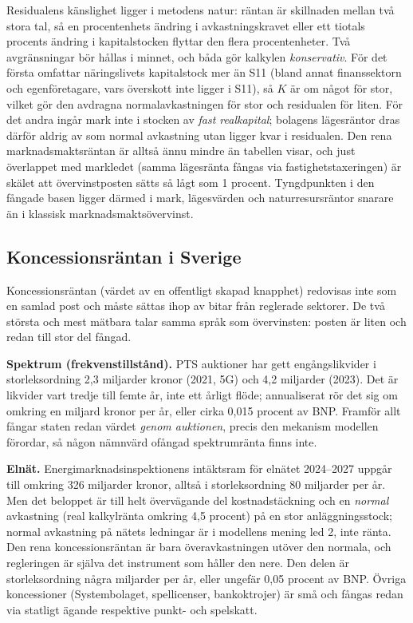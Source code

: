 \documentclass[11pt]{article}
\begin{document}
Residualens känslighet ligger i metodens natur: räntan är skillnaden mellan två stora tal, så en procentenhets ändring i avkastningskravet eller ett tiotals procents ändring i kapitalstocken flyttar den flera procentenheter. Två avgränsningar bör hållas i minnet, och båda gör kalkylen \emph{konservativ}. För det första omfattar näringslivets kapitalstock mer än S11 (bland annat finanssektorn och egenföretagare, vars överskott inte ligger i S11), så $K$ är om något för stor, vilket gör den avdragna normalavkastningen för stor och residualen för liten. För det andra ingår mark inte i stocken av \emph{fast realkapital}; bolagens lägesräntor dras därför aldrig av som normal avkastning utan ligger kvar i residualen. Den rena marknadsmaktsräntan är alltså ännu mindre än tabellen visar, och just överlappet med markledet (samma lägesränta fångas via fastighetstaxeringen) är skälet att övervinstposten sätts så lågt som 1 procent. Tyngdpunkten i den fångade basen ligger därmed i mark, lägesvärden och naturresursräntor snarare än i klassisk marknadsmaktsövervinst.

\subsection*{Koncessionsräntan i Sverige}

Koncessionsräntan (värdet av en offentligt skapad knapphet) redovisas inte som en samlad post och måste sättas ihop av bitar från reglerade sektorer. De två största och mest mätbara talar samma språk som övervinsten: posten är liten och redan till stor del fångad.

\textbf{Spektrum (frekvenstillstånd).} PTS auktioner har gett engångslikvider i storleksordning 2,3 miljarder kronor (2021, 5G) och 4,2 miljarder (2023). Det är likvider vart tredje till femte år, inte ett årligt flöde; annualiserat rör det sig om omkring en miljard kronor per år, eller cirka 0,015 procent av BNP. Framför allt fångar staten redan värdet \emph{genom auktionen}, precis den mekanism modellen förordar, så någon nämnvärd ofångad spektrumränta finns inte.

\textbf{Elnät.} Energimarknadsinspektionens intäktsram för elnätet 2024--2027 uppgår till omkring 326 miljarder kronor, alltså i storleksordning 80 miljarder per år. Men det beloppet är till helt övervägande del kostnadstäckning och en \emph{normal} avkastning (real kalkylränta omkring 4,5 procent) på en stor anläggningsstock; normal avkastning på nätets ledningar är i modellens mening led 2, inte ränta. Den rena koncessionsräntan är bara överavkastningen utöver den normala, och regleringen är själva det instrument som håller den nere. Den delen är storleksordning några miljarder per år, eller ungefär 0,05 procent av BNP. Övriga koncessioner (Systembolaget, spellicenser, bankoktrojer) är små och fångas redan via statligt ägande respektive punkt- och spelskatt.
\end{document}
